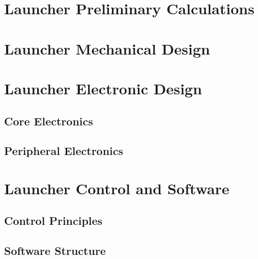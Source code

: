 \section{Launcher Preliminary Calculations}
\label{sec:Launcher Preliminary Calculations}

\clearpage
\section{Launcher Mechanical Design}
\label{sec:Launcher Mechanical Design}

\clearpage
\section{Launcher Electronic Design}
\label{sec:Launcher Electronic Design}
  \subsection{Core Electronics}
  \label{sub:Core Electronics}
  \subsection{Peripheral Electronics}
  \label{sub:Peripheral Electronics}


\clearpage
\section{Launcher Control and Software}
\label{sec:Launcher Control and Software}
  \subsection{Control Principles}
  \label{sub:Control Principles}
  \subsection{Software Structure}
  \label{sub:Software Structure}


